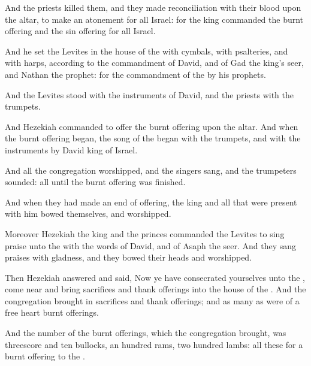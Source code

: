 {And the
priests
killed them, and they made
reconciliation with their
blood upon the
altar, to make an
atonement for all
Israel: for the
king
commanded
{} the burnt
offering and the sin
offering
{} for all
Israel.

And he
set the
Levites in the
house of the
{} with
cymbals, with
psalteries, and with
harps, according to the
commandment of
David, and of
Gad the
king’s
seer, and
Nathan the
prophet: for
{} the
commandment
of the
{}
by his
prophets.

And the
Levites
stood with the
instruments of
David, and the
priests with the
trumpets.

And
Hezekiah
commanded to
offer the burnt
offering upon the
altar. And
when the burnt
offering
began, the
song of the
{}
began
{} with the
trumpets, and with the
instruments
{}
by
David
king of
Israel.

And all the
congregation
worshipped, and the
singers
sang, and the
trumpeters
sounded:
{} all
{} until the burnt
offering was
finished.

And when they had made an
end of
offering, the
king and all that were
present with him
bowed themselves, and
worshipped.

Moreover
Hezekiah the
king and the
princes
commanded the
Levites to sing
praise unto the
{} with the
words of
David, and of
Asaph the
seer. And they sang
praises with
gladness, and they bowed their
heads and
worshipped.

Then
Hezekiah
answered and
said, Now ye have
consecrated yourselves unto the
{}, come
near and
bring
sacrifices and thank
offerings into the
house of the
{}. And the
congregation brought
in
sacrifices and thank
offerings; and as many as were of a
free
heart burnt
offerings.

And the
number of the burnt
offerings, which the
congregation
brought, was threescore and
ten
bullocks, an
hundred
rams,
{} two
hundred
lambs: all these
{} for a burnt
offering to the
{}.

}
